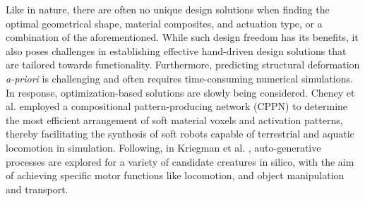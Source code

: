 
Like in nature, there are often no unique design solutions when finding the optimal geometrical shape, material composites, and actuation type, or a combination of the aforementioned. While such design freedom has its benefits, it also poses challenges in establishing effective hand-driven design solutions that are tailored towards functionality. Furthermore, predicting structural deformation \textit{a-priori} is challenging and often requires time-consuming numerical simulations. In response, optimization-based solutions are slowly being considered. Cheney et al. \cite{Cheney2013} employed a compositional pattern-producing network (CPPN) to determine the most efficient arrangement of soft material voxels and activation patterns, thereby facilitating the synthesis of soft robots capable of terrestrial and aquatic locomotion in simulation. Following, in Kriegman et al. \cite{Kriegman2019,Kriegman2020}, auto-generative processes are explored for a variety of candidate creatures in silico, with the aim of achieving specific motor functions like locomotion, and object manipulation and transport.

